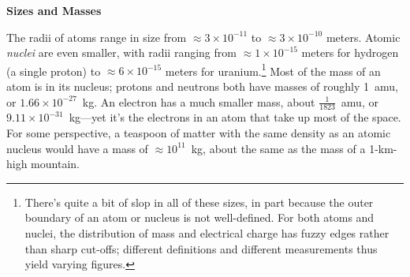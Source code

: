 {{} %

\textbf{Sizes and Masses}

The radii of atoms range in size from $\approx 3 \times 10^{-11}$ to $\approx 3 \times 10^{-10}$ meters.  Atomic \textit{nuclei} are even smaller, with radii ranging from $\approx 1 \times 10^{-15}$ meters for hydrogen (a single proton) to $\approx 6 \times 10^{-15}$ meters for uranium.\footnote{There's quite a bit of slop in all of these sizes, in part because the outer boundary of an atom or nucleus is not well-defined.  For both atoms and nuclei, the distribution of mass and electrical charge has fuzzy edges rather than sharp cut-offs; different definitions and different measurements thus yield varying figures.}
Most of the mass of an atom is in its nucleus; protons and neutrons both have masses of roughly 1~amu, or $1.66\times 10^{-27}$~kg.  An electron has a much smaller mass, about $\frac{1}{1823}$~amu, or $9.11\times 10^{-31}$~kg---yet it's the electrons in an atom that take up most of the space.  
For some perspective, a teaspoon of matter with the same density as an atomic nucleus would have a mass of $\approx 10^{11}$~kg, about the same as the mass of a 1-km-high mountain.  

} %
